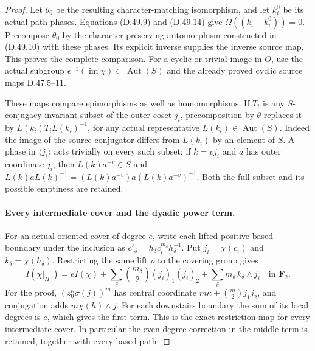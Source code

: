 \begin{proof}
Let \(\theta_0\) be the resulting character-matching isomorphism,
and let \(k_i^0\) be its actual path phases.
Equations \textup{(D.49.9)} and \textup{(D.49.14)} give
\(\Omega((k_i-k_i^0))=0\). Precompose \(\theta_0\) by the
character-preserving automorphism constructed in
\textup{(D.49.10)} with these phases. Its explicit inverse supplies
the inverse source map. This proves the complete comparison.
For a cyclic or trivial image in \(O\), use the actual subgroup
\(\epsilon^{-1}(\operatorname{im}\chi)\subset\operatorname{Aut}(S)\)
and the already proved cyclic source maps D.47.5--11.

These maps compare epimorphisms as well as homomorphisms.
If \(T_i\) is any \(S\)-conjugacy invariant subset of the outer coset
\(j_i\), precomposition by \(\theta\) replaces it by
\(L(k_i)T_iL(k_i)^{-1}\), for any actual representative
\(L(k_i)\in\operatorname{Aut}(S)\).
Indeed the image of the source conjugator differs from \(L(k_i)\)
by an element of \(S\). A phase in \(\langle j_i\rangle\) acts
trivially on every such subset: if \(k=vj_i\) and \(a\) has outer
coordinate \(j_i\), then \(L(k)a^{-v}\in S\) and
\(L(k)aL(k)^{-1}=(L(k)a^{-v})a(L(k)a^{-v})^{-1}\).
Both the full subset and its possible emptiness are retained.

\paragraph{Every intermediate cover and the dyadic power term.}
For an actual oriented cover of degree \(e\), write each lifted
positive based boundary under the inclusion as
\(c'_\delta=h_\delta c_i^{m_\delta}h_\delta^{-1}\).
Put \(j_i=\chi(c_i)\) and \(k_\delta=\chi(h_\delta)\).
Restricting the same lift \(\rho\) to the covering group gives
\[
 I(\chi|_{\Pi'})
 =eI(\chi)
  +\sum_\delta {m_\delta\choose2}(j_i)_1(j_i)_2
  +\sum_\delta m_\delta\,k_\delta\wedge j_i
                 \quad\text{in }\mathbf F_2.
 \tag{D.49.15}
\]
For the proof, \((z_0^\kappa\sigma(j))^m\) has central coordinate
\(m\kappa+\binom m2j_1j_2\), and conjugation adds
\(m\chi(h)\wedge j\). For each downstairs boundary the sum of
its local degrees is \(e\), which gives the first term.
This is the exact restriction map for every intermediate cover.
In particular the even-degree correction in the middle term is
retained, together with every based path.


\end{proof}
